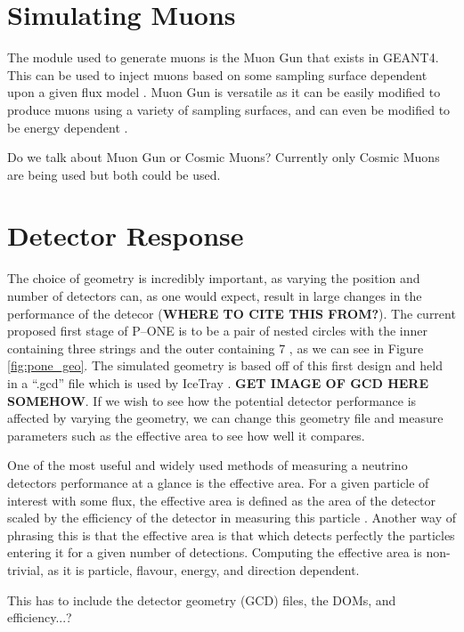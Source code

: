 \section{Simulating Muons}

The module used to generate muons is the Muon Gun that exists in GEANT4. This can be used to inject muons based on some sampling surface dependent upon a given flux model \cite{icetray}. Muon Gun is versatile as it can be easily modified to produce muons using a variety of sampling surfaces, and can even be modified to be energy dependent \cite{icetray}.

Do we talk about Muon Gun or Cosmic Muons? Currently only Cosmic Muons are being used but both could be used.

\section{Detector Response}

The choice of geometry is incredibly important, as varying the position and number of detectors can, as one would expect, result in large changes in the performance of the detecor (\textbf{WHERE TO CITE THIS FROM?}). The current proposed first stage of P--ONE is to be a pair of nested circles with the inner containing three strings and the outer containing 7 \cite{pone}, as we can see in Figure \ref{fig:pone_geo}. The simulated geometry is based off of this first design and held in a ``.gcd'' file which is used by IceTray \cite{icetray}. \textbf{GET IMAGE OF GCD HERE SOMEHOW}. If we wish to see how the potential detector performance is affected by varying the geometry, we can change this geometry file and measure parameters such as the effective area to see how well it compares.

One of the most useful and widely used methods of measuring a neutrino detectors performance at a glance is the effective area. For a given particle of interest with some flux, the effective area is defined as the area of the detector scaled by the efficiency of the detector in measuring this particle \cite{2010icecube}. Another way of phrasing this is that the effective area is that which detects perfectly the particles entering it for a given number of detections. Computing the effective area is non-trivial, as it is particle, flavour, energy, and direction dependent. 

This has to include the detector geometry (GCD) files, the DOMs, and efficiency...?

